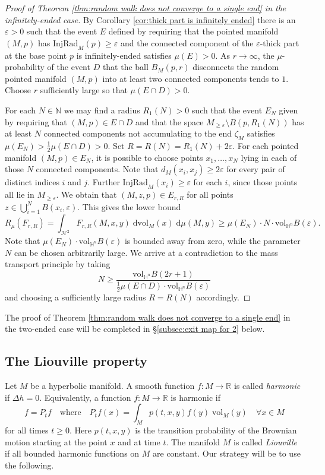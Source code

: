 \documentclass{amsart}
\newcommand{\NN}{\mathbb{N}}
\newcommand{\HH}{\mathbb{H}}
\newcommand{\Hypers}{\mathcal{H}}
\theoremstyle{plain}
\numberwithin{equation}{section}
\theoremstyle{definition}
\begin{document}
\begin{proof}[Proof of Theorem \ref{thm:random walk does not converge to a single end} in the infinitely-ended case]
By Corollary \ref{cor:thick part is infinitely ended} there is an  $\varepsilon  >0$ such that the event $E$ defined by requiring that the pointed manifold $(M,p)$ has  $\mathrm{InjRad}_M(p) \ge \varepsilon$ and the connected component of the $\varepsilon$-thick part at the base point $p$ is infinitely-ended satisfies $\mu(E)>0$. 
As $r\to \infty$, the $\mu$-probability of the event $D$ that the ball $B_M(p,r)$ disconnects the random pointed manifold $(M,p)$ into at least two connected components tends to $1$.
Choose $r$ sufficiently large so that  $\mu(E\cap D) > 0$.

For each $N \in \NN$ we may find a radius $R_1(N) > 0$ such that the event $E_N$ given by requiring that $(M,p) \in E\cap D$ and that the space $M_{\ge \varepsilon} \setminus B(p,R_1(N))$ has at least $N$  connected components not accumulating to the end $\zeta_M$ satisfies $\mu(E_N) > \frac{1}{2}\mu(E\cap D)>0$.
Set $R = 
R(N) = R_1(N) + 2\varepsilon$. For each pointed manifold $(M,p) \in E_N$, it is possible to choose points $x_1,\ldots,x_N$ lying in each of those $N$ connected components. Note that $d_M(x_i,x_j) \ge 2\varepsilon$ for every  pair of distinct indices $i$ and $j$. Further $\mathrm{InjRad}_M(x_i) \ge \varepsilon$ for each $i$, since those points all lie in $M_{\ge \varepsilon}$. We obtain that $(M,z,p) \in E_{r,R}$ for all points $z \in \bigcup_{i=1}^N B(x_i,\varepsilon)$. This gives  the lower bound
$$ R_\mu(F_{r,R}) = \int_{\Hypers^2} F_{r,R}(M,x,y) \; \mathrm{dvol}_M(x) \; \mathrm{d}\mu(M,y)  \ge \mu(E_N)\cdot N \cdot \mathrm{vol}_{\HH^n} B(\varepsilon).$$
Note that $\mu(E_N) \cdot \mathrm{vol}_{\HH^n} B(\varepsilon)$ is bounded away from zero, while the parameter $N$ can be chosen arbitrarily large. We arrive at a contradiction to the mass transport principle by taking
 $$N \ge \frac{\mathrm{vol}_{\HH^n} B(2r+1)}{
 \tfrac12\mu(E\cap D) \cdot \mathrm{vol}_{\HH^n} B(\varepsilon)}$$
and choosing a sufficiently large radius $R = R(N)$ accordingly.
\end{proof}

The proof of Theorem \ref{thm:random walk does not converge to a single end} in the two-ended case will be completed in \S\ref{subsec:exit map for 2} below.

\subsection{The Liouville property}
\label{sub:Liouville}

Let $M$ be a hyperbolic manifold. A smooth function $f : M \to \mathbb{R}$ is called \emph{harmonic} if $\Delta h=0$. Equivalently, a function $f : M \to \mathbb{R}$ is harmonic if $$f =P_tf  \quad \text{where} \quad P_tf(x) = \int_M p(t,x,y)f(y)  \; \mathrm{vol}_M(y) \quad \forall x \in M $$
for all times $t \ge 0$. Here $p(t,x,y)$ is the transition probability of the Brownian motion starting at the point $x$ and at time $t$. The manifold $M$ is called \emph{Liouville} if all bounded harmonic functions on $M$ are constant. Our strategy will be to use the following.
\end{document}
